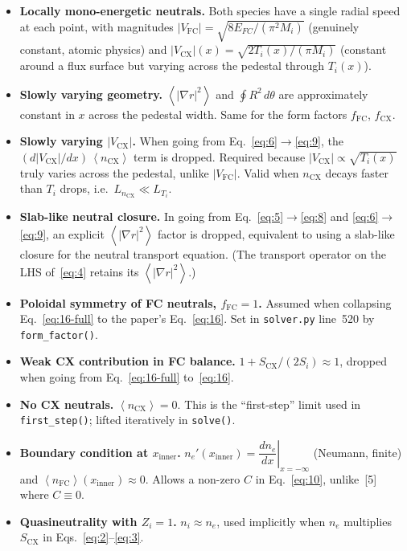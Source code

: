 \documentclass[11pt]{article}
\renewcommand{\ne}{n_{e}}  %
\newcommand{\nfc}{n_{\mathrm{FC}}}
\newcommand{\ncx}{n_{\mathrm{CX}}}
\newcommand{\Vfc}{\lvert V_{\mathrm{FC}}\rvert}
\newcommand{\Vcx}{\lvert V_{\mathrm{CX}}\rvert}
\newcommand{\Si}{S_{i}}
\newcommand{\Scx}{S_{\mathrm{CX}}}
\newcommand{\fFC}{f_{\mathrm{FC}}}
\newcommand{\fCX}{f_{\mathrm{CX}}}
\newcommand{\fsa}[1]{\left\langle #1 \right\rangle}
\newcommand{\gradrsq}{\fsa{|\nabla r|^{2}}}
\newcommand{\neginf}{x=-\infty}
\newcommand{\dneneg}{\left.\dfrac{d\ne}{dx}\right|_{\neginf}}
\newcommand{\xin}{x_{\mathrm{inner}}}
\begin{document}
\begin{itemize}
  \item[\textbf{A1}] \textbf{Locally mono-energetic neutrals.} Both
        species have a single radial speed at each point, with magnitudes
        $\Vfc=\sqrt{8E_{FC}/(\pi^{2}M_{i})}$ (genuinely constant, atomic
        physics) and $\Vcx(x)=\sqrt{2T_{i}(x)/(\pi M_{i})}$ (constant
        around a flux surface but varying across the pedestal through
        $T_i(x)$).
  \item[\textbf{A2}] \textbf{Slowly varying geometry.} $\gradrsq$ and
        $\oint R^{2}\,d\theta$ are approximately constant in $x$ across
        the pedestal width.  Same for the form factors $\fFC$, $\fCX$.
  \item[\textbf{A2b}] \textbf{Slowly varying $\Vcx$.} When going from
        Eq.~\eqref{eq:6}$\to$\eqref{eq:9}, the $(d\Vcx/dx)\,\fsa{\ncx}$
        term is dropped.  Required because $\Vcx\propto\sqrt{T_i(x)}$
        truly varies across the pedestal, unlike $\Vfc$.  Valid when
        $\ncx$ decays faster than $T_i$ drops, i.e.\
        $L_{n_{\mathrm{CX}}}\ll L_{T_i}$.
  \item[\textbf{A3}] \textbf{Slab-like neutral closure.} In going from
        Eq.~\eqref{eq:5}$\to$\eqref{eq:8} and \eqref{eq:6}$\to$\eqref{eq:9},
        an explicit $\gradrsq$ factor is dropped, equivalent to using a
        slab-like closure for the neutral transport equation.  (The
        transport operator on the LHS of~\eqref{eq:4} retains its
        $\gradrsq$.)
  \item[\textbf{A4}] \textbf{Poloidal symmetry of FC neutrals,
        $\fFC=1$.} Assumed when collapsing Eq.~\eqref{eq:16-full} to the
        paper's Eq.~\eqref{eq:16}.  Set in
        \texttt{solver.py} line~520 by \texttt{form\_factor()}.
  \item[\textbf{A5}] \textbf{Weak CX contribution in FC balance.}
        $1+\Scx/(2\Si)\approx 1$, dropped when going from
        Eq.~\eqref{eq:16-full} to~\eqref{eq:16}.
  \item[\textbf{A6}] \textbf{No CX neutrals.} $\fsa{\ncx}=0$.  This is the
        ``first-step'' limit used in \texttt{first\_step()}; lifted
        iteratively in \texttt{solve()}.
  \item[\textbf{A7}] \textbf{Boundary condition at $x_{\mathrm{inner}}$.}
        $\ne'(\xin)=\dneneg$ (Neumann, finite) and
        $\fsa{\nfc}(\xin)\approx 0$.  Allows a non-zero $C$ in
        Eq.~\eqref{eq:10}, unlike~[5] where $C\equiv 0$.
  \item[\textbf{A8}] \textbf{Quasineutrality with $Z_{i}=1$.}
        $n_{i}\approx\ne$, used implicitly when $\ne$ multiplies $\Scx$ in
        Eqs.~\eqref{eq:2}--\eqref{eq:3}.
\end{itemize}
\end{document}
